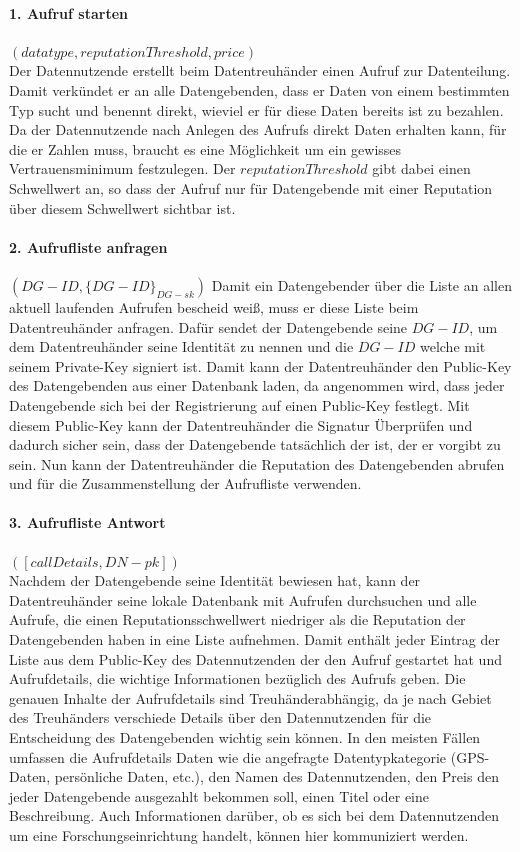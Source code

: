 \documentclass{scrreprt}
\begin{document}
\paragraph{1. Aufruf starten} $(datatype, reputationThreshold, price)$\\
Der Datennutzende erstellt beim Datentreuhänder einen Aufruf zur Datenteilung. Damit verkündet er an alle Datengebenden, dass er Daten von einem bestimmten Typ sucht und benennt direkt, wieviel er für diese Daten bereits ist zu bezahlen. Da der Datennutzende nach Anlegen des Aufrufs direkt Daten erhalten kann, für die er Zahlen muss, braucht es eine Möglichkeit um ein gewisses Vertrauensminimum festzulegen. Der $reputationThreshold$ gibt dabei einen Schwellwert an, so dass der Aufruf nur für Datengebende mit einer Reputation über diesem Schwellwert sichtbar ist.


\paragraph{2. Aufrufliste anfragen} $(DG-ID, {\{DG-ID\}}_{DG-sk})$
Damit ein Datengebender über die Liste an allen aktuell laufenden Aufrufen bescheid weiß, muss er diese Liste beim Datentreuhänder anfragen. Dafür sendet der Datengebende seine $DG-ID$, um dem Datentreuhänder seine Identität zu nennen und die $DG-ID$ welche mit seinem Private-Key signiert ist. Damit kann der Datentreuhänder den Public-Key des Datengebenden aus einer Datenbank laden, da angenommen wird, dass jeder Datengebende sich bei der Registrierung auf einen Public-Key festlegt. Mit diesem Public-Key kann der Datentreuhänder die Signatur Überprüfen und dadurch sicher sein, dass der Datengebende tatsächlich der ist, der er vorgibt zu sein. Nun kann der Datentreuhänder die Reputation des Datengebenden abrufen und für die Zusammenstellung der Aufrufliste verwenden.

\paragraph{3. Aufrufliste Antwort} $([callDetails, DN-pk])$\\
Nachdem der Datengebende seine Identität bewiesen hat, kann der Datentreuhänder seine lokale Datenbank mit Aufrufen durchsuchen und alle Aufrufe, die einen Reputationsschwellwert niedriger als die Reputation der Datengebenden haben in eine Liste aufnehmen. Damit enthält jeder Eintrag der Liste aus dem Public-Key des Datennutzenden der den Aufruf gestartet hat und Aufrufdetails, die wichtige Informationen bezüglich des Aufrufs geben. Die genauen Inhalte der Aufrufdetails sind Treuhänderabhängig, da je nach Gebiet des Treuhänders verschiede Details über den Datennutzenden für die Entscheidung des Datengebenden wichtig sein können. In den meisten Fällen umfassen die Aufrufdetails Daten wie die angefragte Datentypkategorie (GPS-Daten, persönliche Daten, etc.), den Namen des Datennutzenden, den Preis den jeder Datengebende ausgezahlt bekommen soll, einen Titel oder eine Beschreibung. Auch Informationen darüber, ob es sich bei dem Datennutzenden um eine Forschungseinrichtung handelt, können hier kommuniziert werden.
\end{document}
